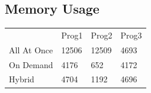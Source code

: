\documentclass[10pt] {article}
\begin{document}
\subsection{Memory Usage}

\begin{tabular}{llll}

 & Prog1 & Prog2 & Prog3 \\
All At Once & 12506 & 12509 & 4693 \\
On Demand & 4176 & 652 & 4172 \\
Hybrid & 4704 & 1192 & 4696 \\

\end{tabular}
\end{document}
